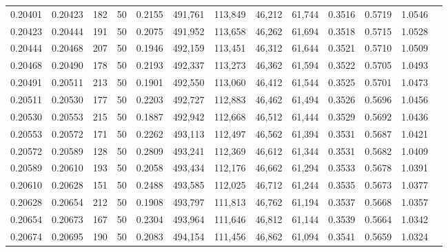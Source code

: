 \begin{tabular}{rrrrrrrrrrrrr}
0.20401 & 0.20423 &   182 &  50 &                                     0.2155 & 491,761 & 113,849 &  46,212 &  61,744 & 0.3516 & 0.5719 & 1.0546 \\
0.20423 & 0.20444 &   191 &  50 &                                     0.2075 & 491,952 & 113,658 &  46,262 &  61,694 & 0.3518 & 0.5715 & 1.0528 \\
0.20444 & 0.20468 &   207 &  50 &                                     0.1946 & 492,159 & 113,451 &  46,312 &  61,644 & 0.3521 & 0.5710 & 1.0509 \\
0.20468 & 0.20490 &   178 &  50 &                                     0.2193 & 492,337 & 113,273 &  46,362 &  61,594 & 0.3522 & 0.5705 & 1.0493 \\
0.20491 & 0.20511 &   213 &  50 &                                     0.1901 & 492,550 & 113,060 &  46,412 &  61,544 & 0.3525 & 0.5701 & 1.0473 \\
0.20511 & 0.20530 &   177 &  50 &                                     0.2203 & 492,727 & 112,883 &  46,462 &  61,494 & 0.3526 & 0.5696 & 1.0456 \\
0.20530 & 0.20553 &   215 &  50 &                                     0.1887 & 492,942 & 112,668 &  46,512 &  61,444 & 0.3529 & 0.5692 & 1.0436 \\
0.20553 & 0.20572 &   171 &  50 &                                     0.2262 & 493,113 & 112,497 &  46,562 &  61,394 & 0.3531 & 0.5687 & 1.0421 \\
0.20572 & 0.20589 &   128 &  50 &                                     0.2809 & 493,241 & 112,369 &  46,612 &  61,344 & 0.3531 & 0.5682 & 1.0409 \\
0.20589 & 0.20610 &   193 &  50 &                                     0.2058 & 493,434 & 112,176 &  46,662 &  61,294 & 0.3533 & 0.5678 & 1.0391 \\
0.20610 & 0.20628 &   151 &  50 &                                     0.2488 & 493,585 & 112,025 &  46,712 &  61,244 & 0.3535 & 0.5673 & 1.0377 \\
0.20628 & 0.20654 &   212 &  50 &                                     0.1908 & 493,797 & 111,813 &  46,762 &  61,194 & 0.3537 & 0.5668 & 1.0357 \\
0.20654 & 0.20673 &   167 &  50 &                                     0.2304 & 493,964 & 111,646 &  46,812 &  61,144 & 0.3539 & 0.5664 & 1.0342 \\
0.20674 & 0.20695 &   190 &  50 &                                     0.2083 & 494,154 & 111,456 &  46,862 &  61,094 & 0.3541 & 0.5659 & 1.0324 \\

\end{tabular}
